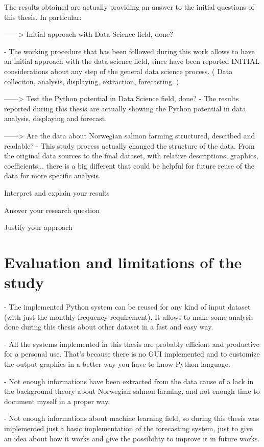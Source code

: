 The results obtained are actually providing an answer to the initial questions of this thesis. In particular:

------> Initial approach with Data Science field, done?

- The working procedure that has been followed during this work allows to have an initial approach with the data science field, since have been reported INITIAL considerations about any step of the general data science process. ( Data colleciton, analysis, displaying, extraction, forecasting..)

------> Test the Python potential in Data Science field, done?
- The results reported during this thesis are actually showing the Python potential in data analysis, displaying and forecast.

------> Are the data about Norwegian salmon farming structured, described and readable?
- This study process actually changed the structure of the data. From the original data sources to the final dataset, with relative descriptions, graphics, coefficients,.. there is a big different that could be helpful for future reuse of the data for more specific analysis.

Interpret and explain your results

Answer your research question

Justify your approach

\section{Evaluation and limitations of the study}
- The implemented Python system can be reused for any kind of input dataset (with just the monthly frequency requirement).
It allows to make some analysis done during this thesis about other dataset in a fast and easy way.
 
- All the systems implemented in this thesis are probably efficient and productive for a personal use. That's because there is no GUI implemented and to customize the output graphics in a better way you have to know Python language.

- Not enough informations have been extracted from the data cause of a lack in the background theory about Norwegian salmon farming, and not enough time to document myself in a proper way.

- Not enough informations about machine learning field, so during this thesis was implemented just a basic implementation of the forecasting system, just to give an idea about how it works and give the possibility to improve it in future works.

